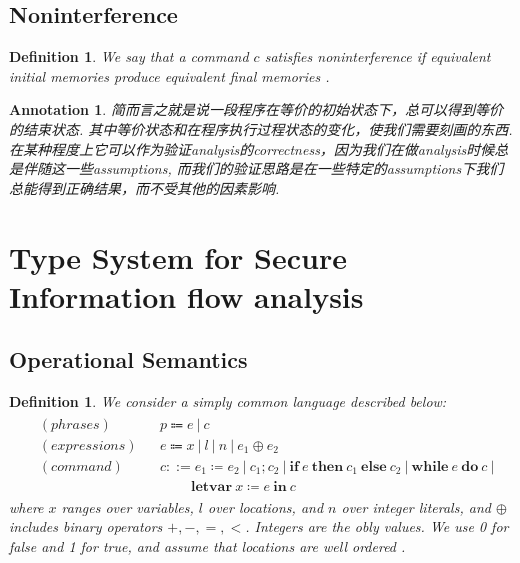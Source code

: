 \documentclass{article}
\newtheorem{definition}[theorem]{Definition}
\newtheorem{annotation}[theorem]{Annotation}
\newcommand{\ifelse}[3]{\ensuremath{\textbf{if}~#1~\textbf{then}~#2~\textbf{else}~#3}}
\newcommand{\newwhiledo}[2]{\ensuremath{\textbf{while}~#1~\textbf{do}~#2}}
\newcommand{\letvar}[2]{\ensuremath{\textbf{letvar}~#1~\textbf{in}~#2}}
\begin{document}
\subsection{Noninterference}

\begin{definition}
\rm We say that a command $c$ satisfies noninterference if equivalent initial memories produce equivalent final memories \cite{noninterference}.
\end{definition}

\begin{annotation}
\rm 简而言之就是说一段程序在等价的初始状态下，总可以得到等价的结束状态. 其中等价状态和在程序执行过程状态的变化，使我们需要刻画的东西. 在某种程度上它可以作为验证analysis的correctness，因为我们在做analysis时候总是伴随这一些assumptions, 而我们的验证思路是在一些特定的assumptions下我们总能得到正确结果，而不受其他的因素影响. 
\end{annotation}

\newpage
\section{Type System for Secure Information flow analysis}

\subsection{Operational Semantics}

\begin{definition}
\rm We consider a simply common language described below:
\[
	\begin{gathered}
	\begin{aligned}
	&(phrases) && p \Coloneqq e~|~c \\
	&(expressions) && e \Coloneqq x ~|~ l ~|~ n ~|~ e_1 \oplus e_2 \\
	&(command) && c ::= e_1 \coloneqq e_2 ~|~ c_1;c_2 ~|~ \ifelse{e}{c_1}{c_2} ~|~ \newwhiledo{e}{c} ~| \\
	&&&\quad\quad~ \letvar{x \coloneqq e}{c}
	\end{aligned}
	\end{gathered}
\]
where $x$ ranges over variables, $l$ over locations, and $n$ over integer literals, and $\oplus$ includes binary operators $+,-,=,<$. Integers are the obly values. We use 0 for false and 1 for true, and assume that locations are well ordered \cite{DGC}.
\end{definition}
\end{document}
